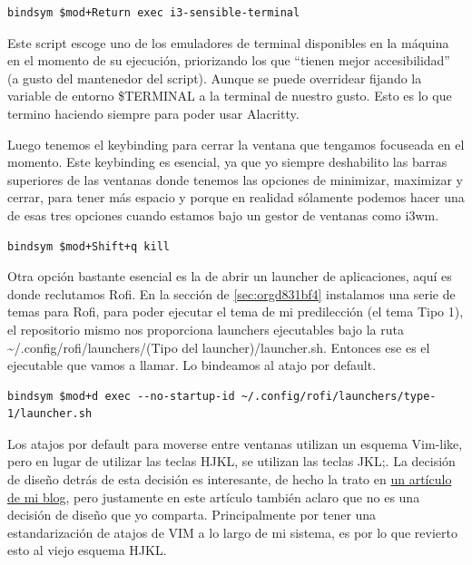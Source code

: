 \documentclass[11pt]{article}
\begin{document}
\begin{verbatim}
bindsym $mod+Return exec i3-sensible-terminal
\end{verbatim}

Este script escoge uno de los emuladores de terminal disponibles en la máquina en el momento de su ejecución, priorizando los que ``tienen mejor accesibilidad'' (a gusto del mantenedor del script). Aunque se puede overridear fijando la variable de entorno \$TERMINAL a la terminal de nuestro gusto. Esto es lo que termino haciendo siempre para poder usar Alacritty.

Luego tenemos el keybinding para cerrar la ventana que tengamos focuseada en el momento. Este keybinding es esencial, ya que yo siempre deshabilito las barras superiores de las ventanas donde tenemos las opciones de minimizar, maximizar y cerrar, para tener más espacio y porque en realidad sólamente podemos hacer una de esas tres opciones cuando estamos bajo un gestor de ventanas como i3wm.

\begin{verbatim}
bindsym $mod+Shift+q kill
\end{verbatim}

Otra opción bastante esencial es la de abrir un launcher de aplicaciones, aquí es donde reclutamos Rofi. En la sección de \ref{sec:orgd831bf4} instalamos una serie de temas para Rofi, para poder ejecutar el tema de mi predilección (el tema Tipo 1), el repositorio mismo nos proporciona launchers ejecutables bajo la ruta \textasciitilde{}/.config/rofi/launchers/(Tipo del launcher)/launcher.sh. Entonces ese es el ejecutable que vamos a llamar. Lo bindeamos al atajo por default.

\begin{verbatim}
bindsym $mod+d exec --no-startup-id ~/.config/rofi/launchers/type-1/launcher.sh
\end{verbatim}

Los atajos por default para moverse entre ventanas utilizan un esquema Vim-like, pero en lugar de utilizar las teclas HJKL, se utilizan las teclas JKL;. La decisión de diseño detrás de esta decisión es interesante, de hecho la trato en \href{https://isaacnietog.github.io/blog/250114gestorDeVentanas/\#bindings-de-vim-a-medias}{un artículo de mi blog}, pero justamente en este artículo también aclaro que no es una decisión de diseño que yo comparta. Principalmente por tener una estandarización de atajos de VIM a lo largo de mi sistema, es por lo que revierto esto al viejo esquema HJKL.
\end{document}
